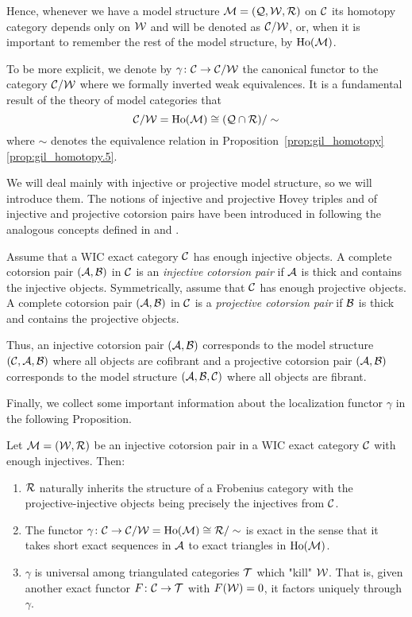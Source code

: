 Hence, whenever we have a model structure $\mathcal{M}=(\mathcal{Q},\mathcal{W},\mathcal{R})$ on $\mathcal{C}$ its homotopy category depends only on $\mathcal{W}$ and will be denoted as $\mathcal{C}/\mathcal{W}$, or, when it is important to remember the rest of the model structure, by $\operatorname{Ho}(\mathcal{M})$.

To be more explicit, we denote by $\gamma\colon\mathcal{C}\to\mathcal{C}/\mathcal{W}$ the canonical functor to the category $\mathcal{C}/\mathcal{W}$ where we formally inverted weak equivalences. It is a fundamental result of the theory of model categories that
\[ \mathcal{C}/\mathcal{W}=\operatorname{Ho}(\mathcal{M})\cong (\mathcal{Q}\cap\mathcal{R})/\sim \]
where $\sim$ denotes the equivalence relation in Proposition~\ref{prop:gil_homotopy}\ref{prop:gil_homotopy.5}.

We will deal mainly with injective or projective model structure, so we will introduce them.
The notions of injective and projective Hovey triples and of injective and projective cotorsion pairs have been introduced in \cite{G7} following the analogous concepts defined in \cite{Beck14} and \cite{G6}.



%
\begin{defn}  Assume that a WIC exact category $\mathcal{C}$ has enough injective objects.
%
A complete cotorsion pair $(\mathcal{A}, \mathcal{B})$ in $\mathcal{C}$ is an \emph{injective cotorsion pair} if $\mathcal{A}$ is thick and contains the injective objects.
Symmetrically, assume that $\mathcal{C}$ has enough projective objects.
%
A complete cotorsion pair $(\mathcal{A}, \mathcal{B})$ in $\mathcal{C}$ is a \emph{projective cotorsion pair} if $\mathcal{B}$ is thick and contains the projective objects.


\end{defn}
%
Thus, an injective cotorsion pair $(\mathcal{A}, \mathcal{B})$ corresponds to the model structure $(\mathcal{C}, \mathcal{A}, \mathcal{B})$ where all objects are cofibrant and a projective cotorsion pair $(\mathcal{A}, \mathcal{B})$ corresponds to the model structure $ (\mathcal{A}, \mathcal{B}, \mathcal{C})$ where all objects are fibrant.

%
%
Finally, we collect some important information about the localization functor $\gamma$ in the following Proposition.

\begin{prop}{\cite[Proposition~3.2]{G7}}
  Let $\mathcal{M}=(\mathcal{W},\mathcal{R})$ be an injective cotorsion pair in a WIC exact category $\mathcal{C}$ with enough injectives. Then:
  \begin{enumerate}
    \item $\mathcal{R}$ naturally inherits the structure of a Frobenius category with the projective-injective objects being precisely the injectives from $\mathcal{C}$.
    \item The functor $\gamma\colon\mathcal{C}\to\mathcal{C}/\mathcal{W}=\operatorname{Ho}(\mathcal{M})\cong {\mathcal{R}/\sim}$ is exact in the sense that it takes short exact sequences in $\mathcal{A}$ to exact triangles in $\operatorname{Ho}(\mathcal{M})$.
    \item $\gamma$ is universal among triangulated categories $\mathcal{T}$ which "kill" $\mathcal{W}$. That is, given another exact functor $F\colon \mathcal{C}\to \mathcal{T}$ with $F(\mathcal{W})=0$, it factors uniquely through $\gamma$.
  \end{enumerate}
\end{prop}

